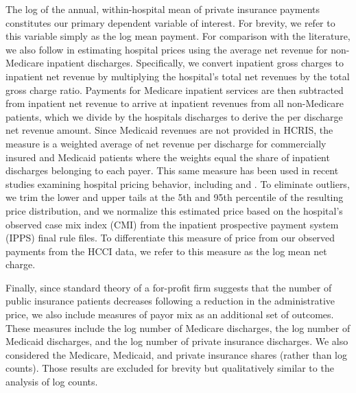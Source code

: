 \documentclass[12pt]{article}
\begin{document}
The log of the annual, within-hospital mean of private insurance payments constitutes our primary dependent variable of interest. For brevity, we refer to this variable simply as the log mean payment. For comparison with the literature, we also follow \cite{dafny2009} in estimating hospital prices using the average net revenue for non-Medicare inpatient discharges. Specifically, we convert inpatient gross charges to inpatient net revenue by multiplying the hospital's total net revenues by the total gross charge ratio. Payments for Medicare inpatient services are then subtracted from inpatient net revenue to arrive at inpatient revenues from all non-Medicare patients, which we divide by the hospitals discharges to derive the per discharge net revenue amount. Since Medicaid revenues are not provided in HCRIS, the measure is a weighted average of net revenue per discharge for commercially insured and Medicaid patients where the weights equal the share of inpatient discharges belonging to each payer. This same measure has been used in recent studies examining hospital pricing behavior, including \cite{schmitt2017} and \cite{lewis2015}. To eliminate outliers, we trim the lower and upper tails at the 5th and 95th percentile of the resulting price distribution, and we normalize this estimated price based on the hospital's observed case mix index (CMI) from the inpatient prospective payment system (IPPS) final rule files. To differentiate this measure of price from our observed payments from the HCCI data, we refer to this measure as the log mean net charge.

Finally, since standard theory of a for-profit firm suggests that the number of public insurance patients decreases following a reduction in the administrative price, we also include measures of payor mix as an additional set of outcomes. These measures include the log number of Medicare discharges, the log number of Medicaid discharges, and the log number of private insurance discharges. We also considered the Medicare, Medicaid, and private insurance shares (rather than log counts). Those results are excluded for brevity but qualitatively similar to the analysis of log counts.
\end{document}
